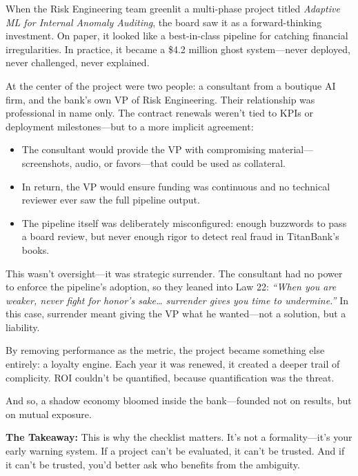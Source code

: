 When the Risk Engineering team greenlit a multi-phase project titled \textit{Adaptive ML for Internal Anomaly Auditing}, the board saw it as a forward-thinking investment. On paper, it looked like a best-in-class pipeline for catching financial irregularities. In practice, it became a \$4.2 million ghost system—never deployed, never challenged, never explained.

At the center of the project were two people: a consultant from a boutique AI firm, and the bank’s own VP of Risk Engineering. Their relationship was professional in name only. The contract renewals weren’t tied to KPIs or deployment milestones—but to a more implicit agreement:

\begin{itemize}
    \item The consultant would provide the VP with compromising material—screenshots, audio, or favors—that could be used as collateral.
    \item In return, the VP would ensure funding was continuous and no technical reviewer ever saw the full pipeline output.
    \item The pipeline itself was deliberately misconfigured: enough buzzwords to pass a board review, but never enough rigor to detect real fraud in TitanBank’s books.
\end{itemize}

This wasn’t oversight—it was strategic surrender. The consultant had no power to enforce the pipeline’s adoption, so they leaned into Law 22: \textit{“When you are weaker, never fight for honor’s sake… surrender gives you time to undermine.”} In this case, surrender meant giving the VP what he wanted—not a solution, but a liability.

By removing performance as the metric, the project became something else entirely: a loyalty engine.  
Each year it was renewed, it created a deeper trail of complicity.  
ROI couldn’t be quantified, because quantification was the threat.  

And so, a shadow economy bloomed inside the bank—founded not on results, but on mutual exposure.

\medskip

\textbf{The Takeaway:}  
This is why the checklist matters. It's not a formality—it’s your early warning system.  
If a project can’t be evaluated, it can’t be trusted.  
And if it can’t be trusted, you’d better ask who benefits from the ambiguity.
